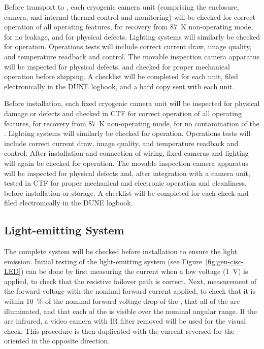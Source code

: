 Before transport to \surf, each cryogenic camera unit (comprising the enclosure, camera, and internal thermal control and monitoring) will be checked for correct operation of all operating features, for recovery from \SI{87}{K} non-operating mode, for no leakage, and for physical defects. Lighting systems will similarly be checked for operation. Operations tests will include correct current draw, image quality, and temperature readback and control. The movable inspection camera apparatus will be inspected for physical defects, and checked for proper mechanical operation before shipping. A checklist will be completed for each unit, filed electronically in the DUNE logbook, and a hard copy sent with each unit. 

Before installation, each fixed cryogenic camera unit will be inspected for physical damage or defects and checked in CTF for correct operation of all operating features, for recovery from \SI{87}{K} non-operating mode, for no contamination of the \lar{}. Lighting systems will similarly be checked for operation. Operations tests will include correct current draw, image quality, and temperature readback and control. After installation and connection of wiring, fixed cameras and lighting will again be checked for operation. The movable inspection camera apparatus will be inspected for physical defects and, after integration with a camera unit, tested in CTF for proper mechanical and electronic operation and cleanliness, before installation or storage. A checklist will be completed for each  check and filed electronically in the DUNE logbook. 

\subsection{Light-emitting System}
\label{sec:fdgen-slow-cryo-qc-les}

The complete system will be checked before installation to ensure the light emission. 
Initial testing of the light-emitting system (see Figure~\ref{fig:gen-cisc-LED}) can be done by first
measuring the current when a low voltage (\SI{1}{V}) is applied, to check
that the resistive  failover path is correct. Next, measurement
of the forward voltage with the nominal forward current applied, to
check that it is within \SI{10}{\%} of the nominal forward voltage drop of
the , that all of the  are illuminated, and that each of the
 is visible over the nominal angular range. If the  are
infrared, a video camera with IR filter removed will be used for the
visual check. This procedure is then duplicated with the current
reversed for the  oriented in the opposite direction.  

